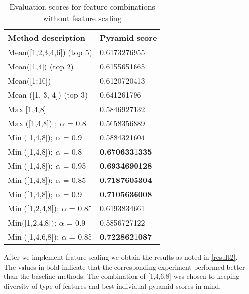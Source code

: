 \begin{table}[!htbp]
\centering
\begin{tabular}{l|l}
\textbf{Method description}                                  & \textbf{Pyramid score}                     \\ \hline
\multicolumn{1}{l|}{Mean({[}1,2,3,4,6{]}) (top 5)}          & \multicolumn{1}{l}{0.6173276955}          \\ \hline
\multicolumn{1}{l|}{Mean({[}1,4{]}) (top 2)}                & \multicolumn{1}{l}{0.6155651665}          \\ \hline
\multicolumn{1}{l|}{Mean({[}1:10{]})}                       & \multicolumn{1}{l}{0.6120720413}          \\ \hline
\multicolumn{1}{l|}{Mean ({[}1, 3, 4{]}) (top 3)}           & \multicolumn{1}{l}{0.641261796}           \\ \hline
\multicolumn{1}{l|}{Max {[}1,4,8{]}}                        & \multicolumn{1}{l}{0.5846927132}          \\ \hline
\multicolumn{1}{l|}{Max ({[}1,4,8{]}) ; $ \alpha $ = 0.8}   & \multicolumn{1}{l}{0.5658356889}          \\ \hline
\multicolumn{1}{l|}{Min ({[}1,4,8{]});  $ \alpha $ = 0.9}   & \multicolumn{1}{l}{0.5884321604}          \\ \hline
\multicolumn{1}{l|}{Min ({[}1,4,8{]}); $ \alpha $ = 0.8}    & \multicolumn{1}{l}{\textbf{0.6706331335}} \\ \hline
\multicolumn{1}{l|}{Min ({[}1,4,8{]}); $ \alpha $ = 0.95}   & \multicolumn{1}{l}{\textbf{0.6934690128}} \\ \hline
\multicolumn{1}{l|}{Min ({[}1,4,8{]}); $ \alpha $ = 0.85}   & \multicolumn{1}{l}{\textbf{0.7187605304}} \\ \hline
\multicolumn{1}{l|}{Min ({[}1,4,8{]}); $ \alpha $ = 0.9}    & \multicolumn{1}{l}{\textbf{0.7105636008}} \\ \hline
\multicolumn{1}{l|}{Min ({[}1,2,4,8{]}); $ \alpha $ = 0.85} & \multicolumn{1}{l}{0.6193834661}          \\ \hline
\multicolumn{1}{l|}{Min({[}1,2,4,8{]}); $ \alpha $ = 0.9}   & \multicolumn{1}{l}{0.5856727122}          \\ \hline
\multicolumn{1}{l|}{Min ({[}1,4,6,8{]}); $ \alpha $ = 0.85} & \multicolumn{1}{l}{\textbf{0.7228621087}} \\ \hline
\end{tabular}
\caption{Evaluation scores for feature combinations without feature scaling }
\label{result1}

\end{table}
\pagebreak
After we implement feature scaling we obtain the results as noted in \ref{result2}. The values in bold indicate that the corresponding experiment performed better than the baseline methods. The combination of [1,4,6,8] was chosen to keeping diversity of type of features and best individual pyramid scores in mind.\\[20pt]

